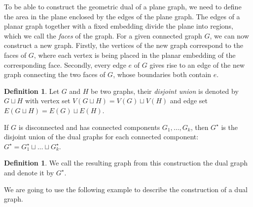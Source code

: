 \documentclass[12pt,a4paper, twoside, autooneside=false]{scrartcl}
\theoremstyle{definition}
\newtheorem{definition}[theorem]{Definition}
\theoremstyle{remark}
\numberwithin{equation}{section}
\begin{document}
To be able to construct the geometric dual of a plane graph, we need to define the area in the plane enclosed by the edges of the plane graph.
The edges of a planar graph together with a fixed embedding divide the plane into regions, which we call the \textit{faces} of the graph. For a given connected graph $G$, we can now construct a new graph. Firstly, the vertices of the new graph correspond to the faces of $G$, where each vertex is being placed in the planar embedding of the corresponding face. Secondly, every edge $e$ of $G$ gives rise to an edge of the new graph connecting the two faces of $G$, whose boundaries both contain $e$. 
\begin{definition} 
Let $G$ and $H$ be two graphs, their \textit{disjoint union} is  denoted by $G \sqcup H$ with vertex set $V(G \sqcup H) = V(G) \sqcup V(H)$ and edge set $E(G \sqcup H) = E(G) \sqcup E(H)$. 
\end{definition}
If $G$ is disconnected and has connected components $G_1, \dots, G_k$, then $G^\star$ is the disjoint union of the dual graphs for each connected component: $G^\star = G_1^\star \sqcup \dots \sqcup G_k^\star$.   
\begin{definition}
We call the resulting graph from this construction the dual graph and denote it by $G^\star$. 
\end{definition}
We are going to use the following example to describe the construction of a dual graph.  
\end{document}
